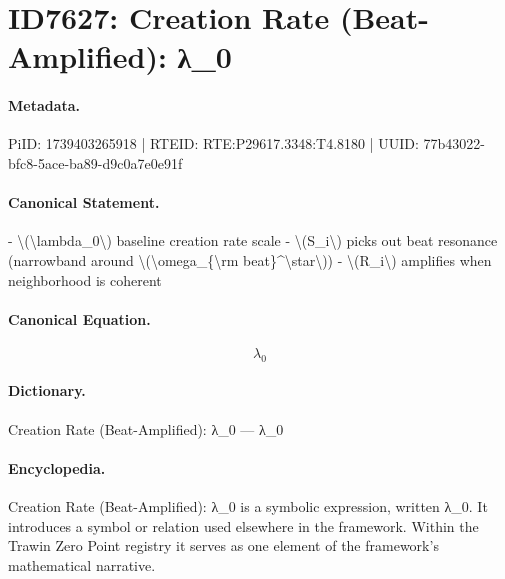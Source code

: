 \section*{ID7627: Creation Rate (Beat-Amplified): λ\_0}
\paragraph{Metadata.}
PiID: 1739403265918 | RTEID: RTE:P29617.3348:T4.8180 | UUID: 77b43022-bfc8-5ace-ba89-d9c0a7e0e91f

\paragraph{Canonical Statement.}
- \textbackslash{}(\textbackslash{}lambda\_0\textbackslash{}) baseline creation rate scale - \textbackslash{}(S\_i\textbackslash{}) picks out beat resonance (narrowband around \textbackslash{}(\textbackslash{}omega\_\{\textbackslash{}rm beat\}\textasciicircum{}\textbackslash{}star\textbackslash{})) - \textbackslash{}(R\_i\textbackslash{}) amplifies when neighborhood is coherent

\paragraph{Canonical Equation.}
\[
\lambda_0
\]

\paragraph{Dictionary.}
Creation Rate (Beat-Amplified): λ\_0 — λ\_0

\paragraph{Encyclopedia.}
Creation Rate (Beat-Amplified): λ\_0 is a symbolic expression, written λ\_0. It introduces a symbol or relation used elsewhere in the framework. Within the Trawin Zero Point registry it serves as one element of the framework's mathematical narrative.
